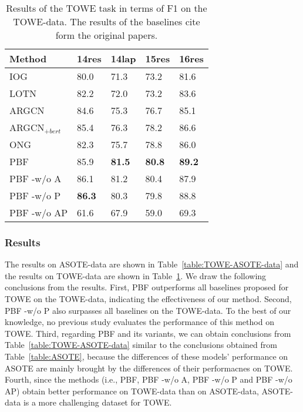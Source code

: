 \documentclass[11pt]{article}
\begin{document}
\begin{table}
	\centering
	\begin{tabular}{|l|l|l|l|l|}
		\hline
		Method          & 14res         & 14lap         & 15res         & 16res         \\ \hline
		IOG             & 80.0         & 71.3         & 73.2         & 81.6         \\ \hline
		LOTN            & 82.2         & 72.0         & 73.2         & 83.6         \\ \hline
		ARGCN           & 84.6         & 75.3         & 76.7         & 85.1         \\ \hline
		ARGCN$_{+bert}$ & 85.4         & 76.3         & 78.2         & 86.6         \\ \hline
		ONG             & 82.3         & 75.7         & 78.8         & 86.0         \\ \hline
		PBF             & 85.9          & \textbf{81.5} & \textbf{80.8} & \textbf{89.2} \\ \hline
		PBF -w/o A      & 86.1          & 81.2          & 80.4          & 87.9          \\ \hline
		PBF -w/o P      & \textbf{86.3} & 80.3          & 79.8          & 88.8          \\ \hline
		PBF -w/o AP     & 61.6          & 67.9          & 59.0            & 69.3          \\ \hline
	\end{tabular}
	\caption{\label{table:TOWE-TOWE-data} Results of the TOWE task in terms of F1 on the TOWE-data. The results of the baselines cite form the original papers.}
\end{table}

\subsubsection{Results}
The results on ASOTE-data are shown in Table~\ref{table:TOWE-ASOTE-data} and the results on TOWE-data are shown in Table~\ref{table:TOWE-TOWE-data}. We
draw the following conclusions from the results.  First, PBF outperforms all baselines proposed for TOWE on the TOWE-data, indicating the effectiveness of our method. Second, PBF -w/o P also surpasses all baselines on the TOWE-data. To the best of our knowledge, no previous study evaluates the performance of this method on TOWE. Third, regarding PBF and its variants, we can obtain conclusions from Table~\ref{table:TOWE-ASOTE-data} similar to the conclusions obtained from Table~\ref{table:ASOTE}, because the differences of these models' performance on ASOTE are mainly brought by the differences of their performacnes on TOWE. Fourth, since the
methods (i.e., PBF, PBF -w/o A, PBF -w/o P and PBF -w/o AP) obtain better performance on TOWE-data
than on ASOTE-data, ASOTE-data is a more
challenging dataset for TOWE.
\end{document}
